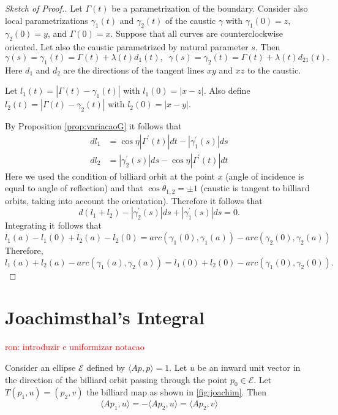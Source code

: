    \begin{proof} [Sketch of Proof.] Let  $\Gamma(t)$  be a  parametrization of the boundary. Consider also local parametrizations   $\gamma_1(t)$ and $\gamma_2(t)$ of the caustic $\gamma$  with $\gamma_1(0)=z$, $\gamma_2(0)=y$, and $\Gamma(0)=x$. Suppose that all curves are   counterclockwise oriented.
   Let also the caustic parametrized by natural parameter $s$. Then
   \[\gamma(s)=\gamma_1(t)=\Gamma(t)+\lambda(t) d_1(t), \;\;\gamma(s)=\gamma_2(t)=\Gamma(t)+\lambda(t) d_21(t).\]
   Here $d_1$ and $d_2$ are the directions of the tangent lines $xy$ and $xz$ to the caustic.
   
   Let $l_1(t)= |\Gamma(t)-\gamma_1(t)|$ with $l_1(0)=|x-z|$. Also define $l_2(t)= |\Gamma(t)-\gamma_2(t)|$ with $l_2(0)=|x-y|$.
   
   By Proposition \ref{prop:variacaoG} it follows that
   \begin{align*}
   dl_1 &=\cos\eta |\Gamma^\prime(t)|dt-|\gamma_1^\prime(s)|ds\\
    dl_2 &=|\gamma_2^\prime(s)|ds-\cos\eta |\Gamma^\prime(t)|dt
   \end{align*}
   Here we used   the condition of billiard orbit at the point $x$ (angle of incidence is equal to angle of reflection) and that $\cos\theta_{1,2}=\pm 1$ (caustic is tangent to billiard orbits, taking into account     the orientation).
   Therefore it follows that
   \[d(l_1+l_2)-|\gamma_2^\prime(s)|ds+|\gamma_1^\prime(s)|ds=0.\]
   Integrating it follows that
   \[l_1(a)-l_1(0)+l_2(a)-l_2(0)=arc(\gamma_1(0),\gamma_1(a))-arc(\gamma_2(0),\gamma_2(a))\]
   Therefore,
   \[l_1(a)+l_2(a)-arc(\gamma_1(a),\gamma_2(a))=l_1(0)+l_2(0)-arc(\gamma_1(0),\gamma_2(0)).\]
   
   
   \end{proof}

\section{Joachimsthal's Integral}

\textcolor{red}{ron: introduzir e uniformizar notacao}


\begin{proposition}\label{prop:invariant_joachim} Consider an ellipse $\mathcal{E}$ defined by $\langle Ap,p\rangle=1$. Let $u$ be an inward unit vector in the direction of the billiard orbit passing through the point $p_0\in\mathcal{E} $. Let $T(p_1,u)=(p_2,v)$ the billiard map as shown in   \cref{fig:joachim}.
	Then 
	\[  \langle Ap_1,u\rangle =  -\langle Ap_2,u\rangle=  \langle Ap_2,v\rangle  \]
	
	\end{proposition}

